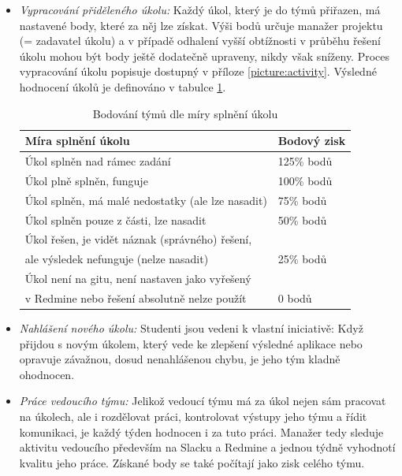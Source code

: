 \begin{itemize}
	\item \emph{Vypracování přiděleného úkolu:} Každý úkol, který je do týmů přiřazen, má nastavené body, které za něj lze získat. Výši bodů určuje manažer projektu (= zadavatel úkolu) a v případě odhalení vyšší obtížnosti v průběhu řešení úkolu mohou být body ještě dodatečně upraveny, nikdy však sníženy. Proces vypracování úkolu popisuje  dostupný v příloze \ref{picture:activity}. Výsledné hodnocení úkolů je definováno v tabulce \ref{table:ranking}.
	\begin{table}[h]
		\caption{Bodování týmů dle míry splnění úkolu}
		\label{table:ranking}
		\begin{tabular}{@{}ll@{}}
			\toprule
			Míra splnění úkolu                                                                           & Bodový zisk \\ \midrule
			Úkol splněn nad rámec zadání                                                                 & 125\% bodů  \\
			Úkol plně splněn, funguje                                                                    & 100\% bodů  \\
			Úkol splněn, má malé nedostatky (ale lze nasadit)                                            & 75\% bodů   \\
			Úkol splněn pouze z části, lze nasadit                                                       & 50\% bodů   \\
			Úkol řešen, je vidět náznak (správného) řešení,\\ale výsledek nefunguje (nelze nasadit)      & 25\% bodů   \\
			Úkol není na gitu, není nastaven jako vyřešený\\v Redmine nebo řešení absolutně nelze použít & 0 bodů   \\ \bottomrule
		\end{tabular}
	\end{table}
	\item \emph{Nahlášení nového úkolu:} Studenti jsou vedeni k vlastní iniciativě: Když přijdou s novým úkolem, který vede ke zlepšení výsledné aplikace nebo opravuje závažnou, dosud nenahlášenou chybu, je jeho tým kladně ohodnocen.
	\item \emph{Práce vedoucího týmu:} Jelikož vedoucí týmu má za úkol nejen sám pracovat na úkolech, ale i rozdělovat práci, kontrolovat výstupy jeho týmu a řídit komunikaci, je každý týden hodnocen i za tuto práci. Manažer tedy sleduje aktivitu vedoucího především na Slacku a Redmine a jednou týdně vyhodnotí kvalitu jeho práce. Získané body se také počítají jako zisk celého týmu.
\end{itemize}

